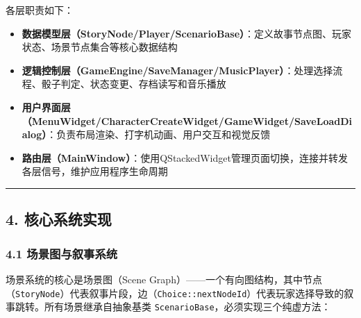 各层职责如下：

\begin{itemize}
\tightlist
\item
  \textbf{数据模型层（StoryNode/Player/ScenarioBase）}：定义故事节点图、玩家状态、场景节点集合等核心数据结构
\item
  \textbf{逻辑控制层（GameEngine/SaveManager/MusicPlayer）}：处理选择流程、骰子判定、状态变更、存档读写和音乐播放
\item
  \textbf{用户界面层（MenuWidget/CharacterCreateWidget/GameWidget/SaveLoadDialog）}：负责布局渲染、打字机动画、用户交互和视觉反馈
\item
  \textbf{路由层（MainWindow）}：使用QStackedWidget管理页面切换，连接并转发各层信号，维护应用程序生命周期
\end{itemize}

\begin{center}\rule{0.5\linewidth}{0.5pt}\end{center}

\hypertarget{ux6838ux5fc3ux7cfbux7edfux5b9eux73b0}{%
\subsection{4.
核心系统实现}\label{ux6838ux5fc3ux7cfbux7edfux5b9eux73b0}}

\hypertarget{ux573aux666fux56feux4e0eux53d9ux4e8bux7cfbux7edf}{%
\subsubsection{4.1
场景图与叙事系统}\label{ux573aux666fux56feux4e0eux53d9ux4e8bux7cfbux7edf}}

场景系统的核心是场景图（Scene
Graph）------一个有向图结构，其中节点（\texttt{StoryNode}）代表叙事片段，边（\texttt{Choice::nextNodeId}）代表玩家选择导致的叙事跳转。所有场景继承自抽象基类
\texttt{ScenarioBase}，必须实现三个纯虚方法：

\begin{Shaded}
\begin{Highlighting}[]
 \OperatorTok{()} \OperatorTok{=} \OperatorTok{;}                              
\OperatorTok{()}  \OperatorTok{=} \OperatorTok{;}                  
 \OperatorTok{(}\OperatorTok{)}  \OperatorTok{=} \OperatorTok{;}    
\end{Highlighting}
\end{Shaded}

